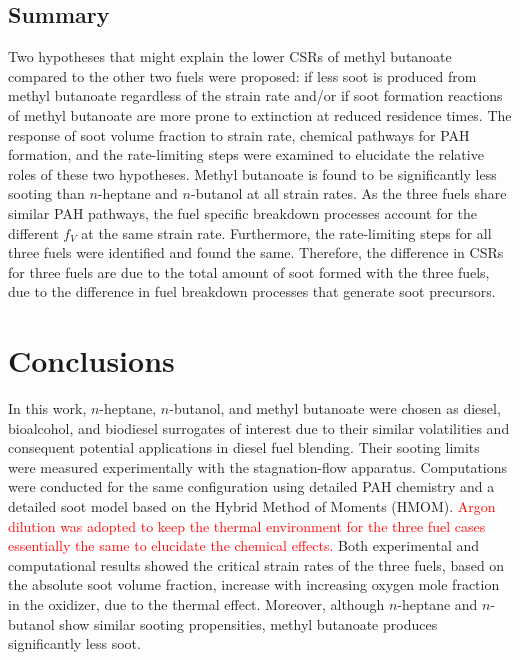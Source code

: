\documentclass[review,3p,times]{elsarticleUS}
\begin{document}
\subsection{Summary}

Two hypotheses that might explain the lower CSRs of methyl butanoate compared to the other two fuels were proposed: if less soot is produced from methyl butanoate regardless of the strain rate and/or if soot formation reactions of methyl butanoate are more prone to extinction at reduced residence times.  The response of soot volume fraction to strain rate, chemical pathways for PAH formation, and the rate-limiting steps were examined to elucidate the relative roles of these two hypotheses.  Methyl butanoate is found to be significantly less sooting than $n$-heptane and $n$-butanol at all strain rates.  As the three fuels share similar PAH pathways, the fuel specific breakdown processes account for the different $f_V$ at the same strain rate.  Furthermore, the rate-limiting steps for all three fuels were identified and found the same.  Therefore, the difference in CSRs for three fuels are due to the total amount of soot formed with the three fuels, due to the difference in fuel breakdown processes that generate soot precursors.



\section{Conclusions}           

In this work, $n$-heptane, $n$-butanol, and methyl butanoate were chosen as diesel, bioalcohol, and biodiesel surrogates of interest due to their similar volatilities and consequent potential applications in diesel fuel blending. Their sooting limits were measured experimentally with the stagnation-flow apparatus. Computations were conducted for the same configuration using detailed PAH chemistry and a detailed soot model based on the Hybrid Method of Moments (HMOM). \textcolor{red}{Argon dilution was adopted to keep the thermal environment for the three fuel cases essentially the same to elucidate the chemical effects.  }Both experimental and computational results showed the critical strain rates of the three fuels, based on the absolute soot volume fraction, increase with increasing oxygen mole fraction in the oxidizer, due to the thermal effect. Moreover, although $n$-heptane and $n$-butanol show similar sooting propensities, methyl butanoate produces significantly less soot.
\end{document}
